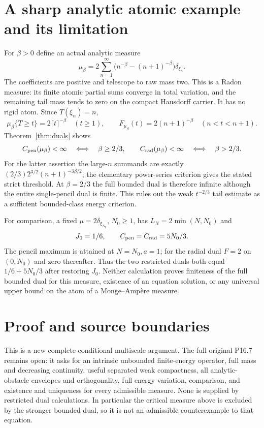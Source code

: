 \documentclass[11pt]{article}
\begin{document}
\section{A sharp analytic atomic example and its limitation}
For $\beta>0$ define an actual analytic measure
\[
 \mu_\beta=2\sum_{n=1}^\infty
             \bigl(n^{-\beta}-(n+1)^{-\beta}\bigr)\delta_{\xi_n}.
\]
The coefficients are positive and telescope to raw mass two. This is a
Radon measure: its finite atomic partial sums converge in total variation,
and the remaining tail mass tends to zero on the compact Hausdorff carrier.
It has no rigid atom. Since $T(\xi_n)=n$,
\[
 \mu_\beta\{T\geq t\}=2\lceil t\rceil^{-\beta}\quad(t\geq1),
 \qquad F_{\mu_\beta}(t)=2(n+1)^{-\beta}\quad(n<t<n+1).
\]
Theorem~\ref{thm:duals} shows
\[
 C_{\rm pen}(\mu_\beta)<\infty\quad\Longleftrightarrow\quad\beta\geq2/3,
 \qquad
 C_{\rm rad}(\mu_\beta)<\infty\quad\Longleftrightarrow\quad\beta>2/3.
\]
For the latter assertion the large-$n$ summands are exactly
$(2/3)2^{3/2}(n+1)^{-3\beta/2}$; the elementary power-series criterion
gives the stated strict threshold. At $\beta=2/3$ the full bounded dual
is therefore infinite although the entire single-pencil dual is finite.
This rules out the weak $t^{-2/3}$ tail estimate as a sufficient
bounded-class energy criterion.

For comparison, a fixed $\mu=2\delta_{\xi_{N_0}}$, $N_0\geq1$, has
$L_N=2\min(N,N_0)$ and
\[
 J_0=1/6,\qquad C_{\rm pen}=C_{\rm rad}=5N_0/3.
\]
The pencil maximum is attained at $N=N_0,a=1$; for the radial dual
$F=2$ on $(0,N_0)$ and zero thereafter. Thus the two restricted duals
both equal $1/6+5N_0/3$ after restoring $J_0$.
Neither calculation proves finiteness of the full bounded dual for this
measure, existence of an equation solution, or any universal upper bound
on the atom of a Monge--Amp\`ere measure.

\section{Proof and source boundaries}
This is a new complete conditional multiscale argument. The full original
P16.7 remains open: it asks for an intrinsic unbounded finite-energy
operator, full mass and decreasing continuity, useful separated weak
compactness, all analytic-obstacle envelopes and orthogonality, full
energy variation, comparison, and existence and uniqueness for every
admissible measure. None is supplied by restricted dual calculations.
In particular the critical measure above is excluded by the stronger
bounded dual, so it is not an admissible counterexample to that equation.
\end{document}
